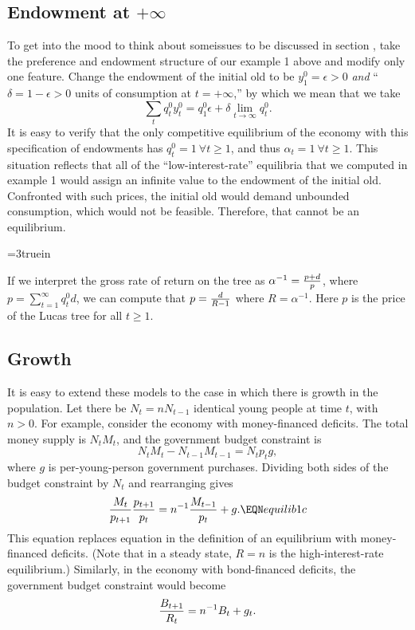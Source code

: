 \subsection{Endowment at $+\infty$}\label{sec:endowment_infty}%
To get  into the mood to think about someissues to be discussed in
 section , take the preference and endowment structure
of our  example 1 above and modify only one feature. Change the
endowment of the initial old to be  $y^0_1 =\epsilon>0 $ {\it and}
``$\delta=1-\epsilon >0$ units of consumption at $t=+\infty$,''
by which we mean that we take
$$ \sum_t q_t^0 y_t^0 = q_1^0 \epsilon + \delta \lim_{t\rightarrow
   \infty} q_t^0.$$
It is easy to verify that the only competitive equilibrium
of the economy with this specification of endowments
has $q_t^0 = 1 \ \forall t\geq 1$, and thus $\alpha_t = 1
\ \forall t \geq 1$.   This situation reflects that
  all  of the ``low-interest-rate'' equilibria  that we computed in example 1
would assign an infinite value to the endowment
of the initial old.  Confronted with such prices, the
initial old would demand unbounded consumption, which would not be 
feasible.  Therefore, that cannot be an equilibrium.

\centerline{\epsfxsize=3truein}
\caption{Unique equilibrium with a fixed-dividend asset.}
\endfigure

    If we interpret the gross rate of return on the
tree as $\alpha^{-1} = {p + d  \over p}$, where $p = \sum_{t=1}^\infty
q_t^0 d$, we can compute that $p = {d \over R-1}$ where
$R = \alpha^{-1}$.  Here $p$ is the price of the
Lucas tree for all $t \geq 1$.

    

\subsection{Growth}

  It is easy to extend these models to the case  in which  there is
growth in the population.  Let there be $N_t = n N_{t-1}$ identical young
people at time $t$, with $n > 0$.   For example, consider the economy
with money-financed deficits.  The total money supply
is $N_t M_t$, and the government budget constraint is
$$ N_t M_t - N_{t-1} M_{t-1} = N_t p_t g, $$
where $g$ is per-young-person government   purchases.
Dividing both sides of the budget constraint by
$ N_t$ and rearranging gives
$$ {M_t \over p_{t+1}} { p_{t+1} \over p_t} = n^{-1} {M_{t-1} \over p_t}
     + g .\EQN equilib1c  $$
This equation replaces equation  in the definition of
an equilibrium with money-financed deficits.  (Note that
in a steady state, $R=n$ is the high-interest-rate equilibrium.)
Similarly, in the economy with bond-financed deficits,
the government budget constraint would become
$$ {B_{t+1} \over R_t} = n^{-1} B_t + g_t .$$

